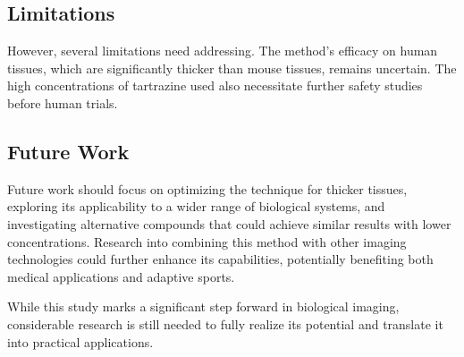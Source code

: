 \documentclass[12pt]{article}
\begin{document}
\subsection{Limitations}
However, several limitations need addressing. The method's efficacy on human tissues, which are significantly thicker than mouse tissues, remains uncertain. The high concentrations of tartrazine used also necessitate further safety studies before human trials.

\subsection{Future Work}
Future work should focus on optimizing the technique for thicker tissues, exploring its applicability to a wider range of biological systems, and investigating alternative compounds that could achieve 
similar results with lower concentrations. Research into combining this method with other imaging technologies could further enhance its capabilities, potentially benefiting both medical applications and adaptive sports.

While this study marks a significant step forward in biological imaging, considerable research is still needed to fully realize its potential and translate it into practical applications.


\newpage
\printbibliography
\end{document}
